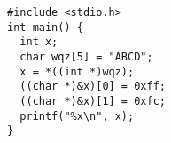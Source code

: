 \documentclass{article}
\begin{document}
\begin{lstlisting}
#include <stdio.h>
int main() {
  int x;
  char wqz[5] = "ABCD";
  x = *((int *)wqz);
  ((char *)&x)[0] = 0xff;
  ((char *)&x)[1] = 0xfc;
  printf("%x\n", x);
}
\end{lstlisting}
\end{document}
